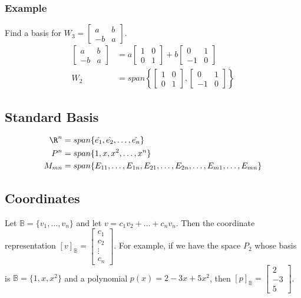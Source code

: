 \documentclass{math}
\begin{document}
\subsubsection*{Example}
Find a basis for \( W_3 = \begin{bmatrix}a & b \\ -b & a\end{bmatrix} \).
\begin{align*}
  \begin{bmatrix}a & b \\ -b & a\end{bmatrix} &=
    a\begin{bmatrix}1 & 0 \\ 0 & 1\end{bmatrix}+
    b\begin{bmatrix}0 & 1 \\ -1 & 0\end{bmatrix} \\
  W_2 &= span\left\{\begin{bmatrix}1 & 0 \\ 0 & 1\end{bmatrix},
    \begin{bmatrix}0 & 1 \\ -1 & 0\end{bmatrix}\right\}
\end{align*}

\subsection*{Standard Basis}
\begin{align*}
  \R^n &= span\{\hat{e_1},\hat{e_2},\dots,\hat{e_n}\} \\
  P^n &= span\{1,x,x^2,\dots,x^n\} \\
  M_{mn} &=
    span\{E_{11},\dots,E_{1n},E_{21},\dots,E_{2n},\dots,E_{m1},\dots,E_{mn}\}
\end{align*}

\subsection*{Coordinates}
Let \( \mathbb{B} = \{v_1,\dots,v_n\} \) and let \( v = c_1v_2+\dots+c_nv_n \).
Then the coordinate representation \( [v]_{\mathbb{B}} = \begin{bmatrix}
c_1 \\ c_2 \\ \vdots \\ c_n\end{bmatrix} \). For example, if we have the
space \( P_2 \) whose basis is \( \mathbb{B} = \{1,x,x^2\} \) and a polynomial
\( p(x) = 2-3x+5x^2 \), then \( [p]_{\mathbb{B}} = \begin{bmatrix}2 \\ -3 \\ 5
\end{bmatrix} \).
\end{document}
